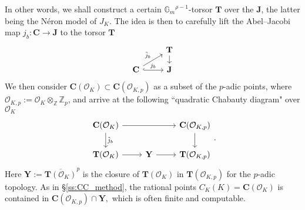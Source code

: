 \documentclass[11pt,oneside]{amsart}
\theoremstyle{plain}
\theoremstyle{definition}
\DeclareMathOperator{\Gm}{\mathbb{G}_m}
\def\TT{\mathbf{T}}
\def\Z{\mathbb{Z}}
\def\Q{\mathbb{Q}}
\def\J{\mathbf{J}}
\def\CC{\mathbf{C}}
\def\ra{\rightarrow}
\def\Gm{{\mathbb{G}_m}}
\def\U{\mathbf{U}}
\def\Y{\mathbf{Y}}
\def\oh{\mathcal{O}}
\begin{document}
In other words, we shall construct a certain $\Gm^{\rho-1}$-torsor $\TT$ over the $\J$, the latter being the N\'eron model of $J_K$. %
The idea is then to carefully lift the Abel--Jacobi map $j_b: \CC \ra \J$ to the torsor $\TT$
\[
\begin{tikzcd}[row sep = 1em]  & \TT \arrow[d] \\ \CC \arrow[ru, "\tilde j_b"]  \arrow[r, hook, "j_b"] & \J \end{tikzcd} 
\]
We then consider $\CC (\oh_K) \subset \CC (\oh_{K, p})$ as a subset of the $p$-adic points, where $\oh_{K, p} := \oh_K \otimes_{\Z} \Z_p$, and arrive at the following ``quadratic Chabauty diagram" over $\oh_K$
\begin{equation} \label{diagram:intro}
 \begin{tikzcd}  \CC(\oh_{K})  \arrow[d,  "\tilde j_b"]  \arrow[rr] &&  \CC(\oh_{K, p}) \arrow[d] \\   \TT(\oh_K)  \arrow[r] & \Y \arrow[r]   & \TT(\oh_{K, p}) \end{tikzcd}. 
 \end{equation}
Here $\Y := \overline{\TT(\oh_K)}^p$ is the closure of $\TT(\oh_K)$ in $\TT(\oh_{K, p})$ for the $p$-adic topology. 
As in \S \ref{ss:CC_method}, the rational points $C_K (K) = \CC(\oh_K)$ is contained in  $ \CC(\oh_{K, p})  \cap \Y,$ which is often finite and computable. 
\end{document}
